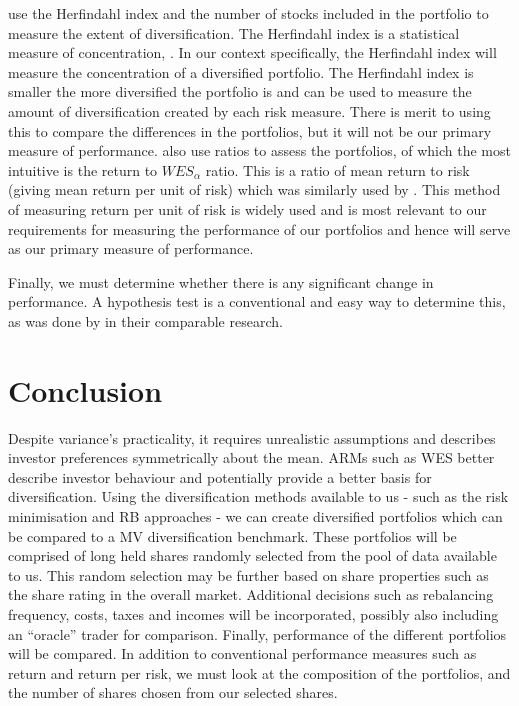 \documentclass[12pt,a4paper]{article}
\begin{document}
\cite{CHEN20111777} use the Herfindahl index and the number of stocks included in the portfolio to measure the extent of diversification. The Herfindahl index is a statistical measure of concentration, \cite{rhoades1993herfindahl}. In our context specifically, the Herfindahl index will measure the concentration of a diversified portfolio. The Herfindahl index is smaller the more diversified the portfolio is and can be used to measure the amount of diversification created by each risk measure. There is merit to using this to compare the differences in the portfolios, but it will not be our primary measure of performance.
\cite{CHEN20111777} also use ratios to assess the portfolios, of which the most intuitive is the return to $WES_{\alpha}$ ratio. This is a ratio of mean return to risk (giving mean return per unit of risk) which was similarly used by \cite{hoe2010empirical}. This method of measuring return per unit of risk is widely used and is most relevant to our requirements for measuring the performance of our portfolios and hence will serve as our primary measure of performance.

Finally, we must determine whether there is any significant change in performance. A hypothesis test is a conventional and easy way to determine this, as was done by \cite{righi2017simulation} in their comparable research.

\section{Conclusion}
\label{sec:Concl}

Despite variance's practicality, it requires unrealistic assumptions and describes investor preferences symmetrically about the mean. ARMs such as WES better describe investor behaviour and potentially provide a better basis for diversification. Using the diversification methods available to us - such as the risk minimisation and RB approaches - we can create diversified portfolios which can be compared to a MV diversification benchmark. These portfolios will be comprised of long held shares randomly selected from the pool of data available to us. This random selection may be further based on share properties such as the share rating in the overall market. Additional decisions such as rebalancing frequency, costs, taxes and incomes will be incorporated, possibly also including an ``oracle'' trader for comparison. Finally, performance of the different portfolios will be compared. In addition to conventional performance measures such as return and return per risk, we must look at the composition of the portfolios, and the number of shares chosen from our selected shares.

\newpage


\label{bib:bibliography}
 
\end{document}
